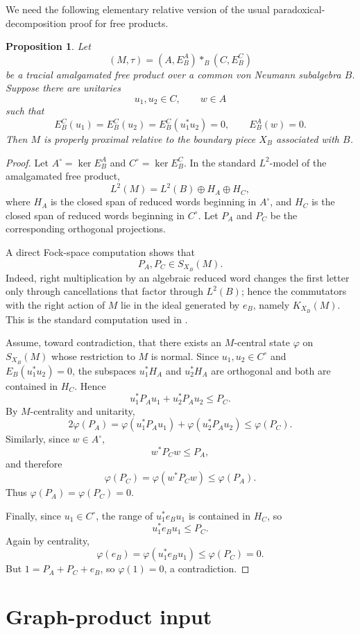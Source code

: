 \documentclass[11pt]{amsart}
\newtheorem{proposition}[theorem]{Proposition}
\theoremstyle{definition}
\newcommand{\freeprod}{\mathop{*}}
\begin{document}
We need the following elementary relative version of the usual paradoxical-decomposition proof for free products.

\begin{proposition}\label{prop:AFP}
Let
\[
(M,\tau)=(A,E_B^A)\freeprod_B(C,E_B^C)
\]
be a tracial amalgamated free product over a common von Neumann subalgebra $B$.  Suppose there are unitaries
\[
u_1,u_2\in C,\qquad w\in A
\]
such that
\[
E_B^C(u_1)=E_B^C(u_2)=E_B^C(u_1^*u_2)=0,
\qquad
E_B^A(w)=0.
\]
Then $M$ is properly proximal relative to the boundary piece $X_B$ associated with $B$.
\end{proposition}

\begin{proof}
Let $A^\circ=\ker E_B^A$ and $C^\circ=\ker E_B^C$.  In the standard $L^2$-model of the amalgamated free product,
\[
L^2(M)=L^2(B)\oplus H_A\oplus H_C,
\]
where $H_A$ is the closed span of reduced words beginning in $A^\circ$, and $H_C$ is the closed span of reduced words beginning in $C^\circ$.  Let $P_A$ and $P_C$ be the corresponding orthogonal projections.

A direct Fock-space computation shows that
\[
P_A,P_C\in S_{X_B}(M).
\]
Indeed, right multiplication by an algebraic reduced word changes the first letter only through cancellations that factor through $L^2(B)$; hence the commutators with the right action of $M$ lie in the ideal generated by $e_B$, namely $K_{X_B}(M)$.  This is the standard computation used in \cite[Section 6]{DKEP}.

Assume, toward contradiction, that there exists an $M$-central state $\varphi$ on $S_{X_B}(M)$ whose restriction to $M$ is normal.  Since $u_1,u_2\in C^\circ$ and $E_B(u_1^*u_2)=0$, the subspaces $u_1^*H_A$ and $u_2^*H_A$ are orthogonal and both are contained in $H_C$.  Hence
\[
u_1^*P_Au_1+u_2^*P_Au_2\leq P_C.
\]
By $M$-centrality and unitarity,
\[
2\varphi(P_A)
=
\varphi(u_1^*P_Au_1)+\varphi(u_2^*P_Au_2)
\leq \varphi(P_C).
\]
Similarly, since $w\in A^\circ$,
\[
w^*P_Cw\leq P_A,
\]
and therefore
\[
\varphi(P_C)=\varphi(w^*P_Cw)\leq \varphi(P_A).
\]
Thus $\varphi(P_A)=\varphi(P_C)=0$.

Finally, since $u_1\in C^\circ$, the range of $u_1^*e_Bu_1$ is contained in $H_C$, so
\[
u_1^*e_Bu_1\leq P_C.
\]
Again by centrality,
\[
\varphi(e_B)=\varphi(u_1^*e_Bu_1)\leq \varphi(P_C)=0.
\]
But $1=P_A+P_C+e_B$, so $\varphi(1)=0$, a contradiction.
\end{proof}

\section{Graph-product input}
\end{document}
